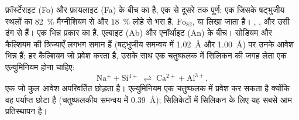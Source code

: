  फ़ॉर्स्टेराइट  (Fo) और फ़ायलाइट  (Fa) के बीच का  है, एक  से
दूसरे तक पूर्ण: एक  जिसके षट्भुजीय स्थलों का \qty{82}{\percent} मैग्नीशियम से और \qty{18}{\percent} लोहे से
भरा है, $\text{Fo}_{82}$, या  लिखा जाता है। , ,  और  उसी
ढंग से  हैं।   एक भिन्न प्रकार का  है, एल्बाइट  (Ab) और
एनॉर्थाइट  (An) के बीच। सोडियम और कैल्शियम की त्रिज्याएँ लगभग समान हैं
(षट्भुजीय समन्वय में \qty{1.02}{\angstrom} और \qty{1.00}{\angstrom}) पर उनके आवेश भिन्न हैं; हर कैल्शियम जो प्रवेश
करता है, उसके साथ एक चतुष्फलक में सिलिकन की जगह लेता एक एल्युमिनियम होना चाहिए:
\[
  \mathrm{Na^{+}} + \mathrm{Si^{4+}} \;\rightleftharpoons\; \mathrm{Ca^{2+}} + \mathrm{Al^{3+}},
\]
एक  जो कुल आवेश अपरिवर्तित छोड़ता है।
एल्युमिनियम एक चतुष्फलक में प्रवेश कर सकता है क्योंकि वह पर्याप्त छोटा है (चतुष्फलकीय समन्वय में
\qty{0.39}{\angstrom}); सिलिकेटों में सिलिकन के लिए यह सबसे आम प्रतिस्थापन है।

